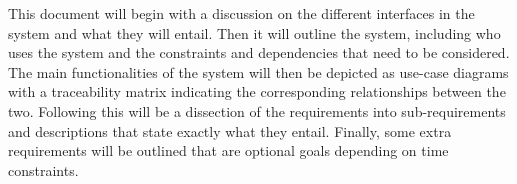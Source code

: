 This document will begin with a discussion on the different interfaces in the system and what they will entail. 
        Then it will outline the system, including who uses the system and the constraints and dependencies that need to be considered.
         The main functionalities of the system will then be depicted as use-case diagrams with a traceability matrix indicating 
         the corresponding relationships between the two. Following this will be a dissection of the requirements into 
         sub-requirements and descriptions that state exactly what they entail. Finally, some extra requirements will
          be outlined that are optional goals depending on time constraints.
